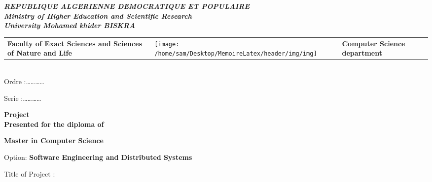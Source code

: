 \documentclass[12pt,oneside,english]{book}
\providecommand{\tabularnewline}{\\}
\begin{document}
\begin{titlepage}

\begin{center}
\textbf{\textsl{\large{}REPUBLIQUE ALGERIENNE DEMOCRATIQUE ET POPULAIRE}}\textbf{\textsl{\small{}}}\\
\textbf{\textsl{ Ministry of Higher Education and Scientific Research }}\textbf{\textsl{\small{}}}\\
\textbf{\textsl{  University Mohamed khider  {  \textendash{}
BISKRA}}}
\par\end{center}

\begin{tabular}{>{\centering}m{45mm}>{\centering}m{40mm}>{\centering}m{60mm}}
\centering{}\textbf{Faculty of Exact Sciences 
and Sciences of Nature and Life } & \centering

\texttt{[image: /home/sam/Desktop/MemoireLatex/header/img/img]} & \centering{}\textbf{Computer Science department}\tabularnewline
\end{tabular}\\


{\small{}Ordre :\dots \dots \dots \dots{} }{\small \par}

{\small{}Serie :\dots \dots \dots \dots{}}{\small \par}

\begin{center}
\textbf{Project}\\
\textbf{Presented for the diploma of }
\par\end{center}

\begin{center}
\textbf{\large{}Master in Computer Science }   
\par\end{center}

\begin{center}
Option: \textbf{Software Engineering and Distributed Systems }
\par\end{center}

\vspace*{10mm}

Title of Project :

\begin{center}
{\LARGE{}}%
\vspace*{10mm}


\end{center}
\end{titlepage}
\end{document}
